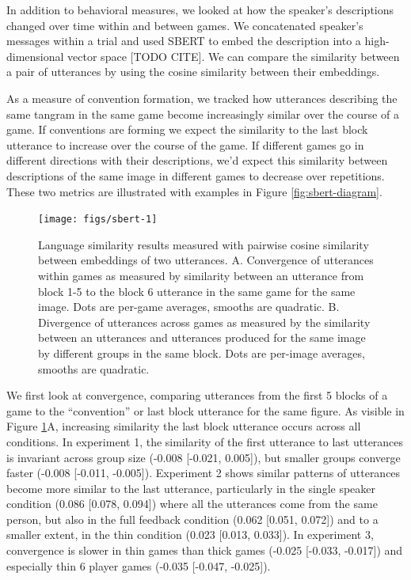 \documentclass[
  english,
  a4paper,
]{article}
\begin{document}
In addition to behavioral measures, we looked at how the speaker's descriptions changed over time within and between games. We concatenated speaker's messages within a trial and used SBERT to embed the description into a high-dimensional vector space {[}TODO CITE{]}. We can compare the similarity between a pair of utterances by using the cosine similarity between their embeddings.

As a measure of convention formation, we tracked how utterances describing the same tangram in the same game become increasingly similar over the course of a game. If conventions are forming we expect the similarity to the last block utterance to increase over the course of the game. If different games go in different directions with their descriptions, we'd expect this similarity between descriptions of the same image in different games to decrease over repetitions. These two metrics are illustrated with examples in Figure \ref{fig:sbert-diagram}.

\begin{figure}[t!]

{\centering \texttt{[image: figs/sbert-1]} 

}

\caption{Language similarity results measured with pairwise cosine similarity between embeddings of two utterances. A. Convergence of utterances within games as measured by similarity between an utterance from block 1-5 to the block 6 utterance in the same game for the same image. Dots are per-game averages, smooths are quadratic. B. Divergence of utterances across games as measured by the similarity between an utterances and utterances produced for the same image by different groups in the same block. Dots are per-image averages, smooths are quadratic.}\label{fig:sbert}
\end{figure}

We first look at convergence, comparing utterances from the first 5 blocks of a game to the ``convention'' or last block utterance for the same figure. As visible in Figure \ref{fig:sbert}A, increasing similarity the last block utterance occurs across all conditions. In experiment 1, the similarity of the first utterance to last utterances is invariant across group size (-0.008 {[}-0.021, 0.005{]}), but smaller groups converge faster (-0.008 {[}-0.011, -0.005{]}). Experiment 2 shows similar patterns of utterances become more similar to the last utterance, particularly in the single speaker condition (0.086 {[}0.078, 0.094{]}) where all the utterances come from the same person, but also in the full feedback condition (0.062 {[}0.051, 0.072{]}) and to a smaller extent, in the thin condition (0.023 {[}0.013, 0.033{]}). In experiment 3, convergence is slower in thin games than thick games (-0.025 {[}-0.033, -0.017{]}) and especially thin 6 player games (-0.035 {[}-0.047, -0.025{]}).
\end{document}
